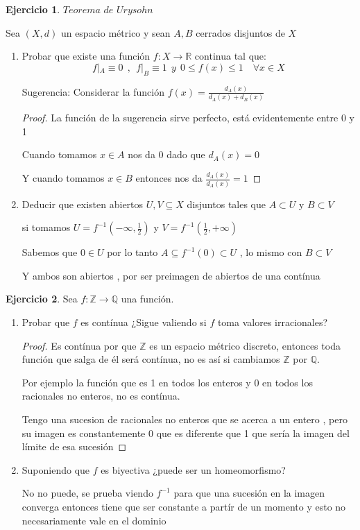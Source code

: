 \documentclass[11pt]{report}
\newcommand{\Q}{\mathbb{Q}}
\newcommand{\R}{\mathbb{R}}
\newcommand{\Z}{\mathbb{Z}}
\newcommand{\ra}{\rightarrow}
\theoremstyle{definition}
\newtheorem{ej}{Ejercicio}
\begin{document}
	\begin{ej}
		$Teorema$ $de$ $Urysohn$	

		Sea $(X,d)$ un espacio métrico y sean $A,B$ cerrados disjuntos de $X$
		\begin{enumerate}
			\item Probar que existe una función $f: X \ra \R$ continua tal que:
				$$ f|_A \equiv 0 \ \ , \ \ f|_B \equiv 1 \ \ y \ \ 0 \leq f(x) \leq 1 \quad \forall x \in X$$

				Sugerencia: Considerar la función $f(x) = \frac{d_A(x)}{d_A(x) + d_B(x)}$
				\begin{proof}
					La función de la sugerencia sirve perfecto, está evidentemente entre 0 y 1 

					Cuando tomamos $x \in A$ nos da 0 dado que $d_A(x) = 0$

					Y cuando tomamos $x \in B$ entonces nos da $\frac{d_A(x)}{d_A(x)} = 1$ 
				\end{proof}
			\item Deducir que existen abiertos $U,V \subseteq X$ disjuntos tales que $A \subset U$ y $B \subset V$

				si tomamos $ U = f^{-1}(-\infty,\frac{1}{2})$ y $V = f^{-1}(\frac{1}{2},+\infty)$

				Sabemos que $0 \in U $ por lo tanto $A \subseteq f^{-1}(0)\subset U$ , lo mismo con $B \subset V$

				Y ambos son abiertos , por ser preimagen de abiertos de una contínua
				
		\end{enumerate}
	\end{ej}
	
	\begin{ej}
		Sea $f: \Z \ra \Q$ una función.
		\begin{enumerate}
			\item Probar que $f$ es contínua ¿Sigue valiendo si $f$ toma valores irracionales?
				\begin{proof}
					Es contínua por que $\Z$ es un espacio métrico discreto, entonces toda función que salga de él será contínua, no es así si cambiamos $\Z$ por $\Q$.  

					Por ejemplo la función que es 1 en todos los enteros y 0 en todos los racionales no enteros, no es contínua. 	

					Tengo una sucesion de racionales no enteros que se acerca a un entero , pero su imagen es constantemente 0 que es diferente que 1 que sería la imagen del límite de esa sucesión
				\end{proof}
			\item Suponiendo que $f$ es biyectiva ¿puede ser un homeomorfismo?

				No no puede, se prueba viendo $f^{-1}$ para que una sucesión en la imagen converga entonces tiene que ser constante a partír de un momento y esto no necesariamente vale en el dominio

		\end{enumerate}
	\end{ej}
	
\end{document}
